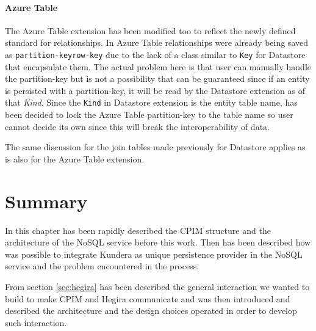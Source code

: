 \paragraph{Azure Table} The Azure Table extension has been modified too to reflect the newly defined standard for relationships. In Azure Table relationships were already being saved as \texttt{partition-key\textunderscore row-key} due to the lack of a class similar to \texttt{Key} for Datastore that encapsulate them. The actual problem here is that user can manually handle the partition-key but is not a possibility that can be guaranteed since if an entity is persisted with a partition-key, it will be read by the Datastore extension as of that \textit{Kind}.
Since the \texttt{Kind} in Datastore extension is the entity table name, has been decided to lock the Azure Table partition-key to the table name so user cannot decide its own since this will break the interoperability of data.

\noindent The same discussion for the join tables made previously for Datastore applies as is also for the Azure Table extension.

\section{Summary}
In this chapter has been rapidly described the CPIM structure and the architecture of the NoSQL service before this work. Then has been described how was possible to integrate Kundera as unique persistence provider in the NoSQL service and the problem encountered in the process.

\noindent From section \ref{sec:hegira} has been described the general interaction we wanted to build to make CPIM and Hegira communicate and was then introduced and described the architecture and the design choices operated in order to develop such interaction. 
